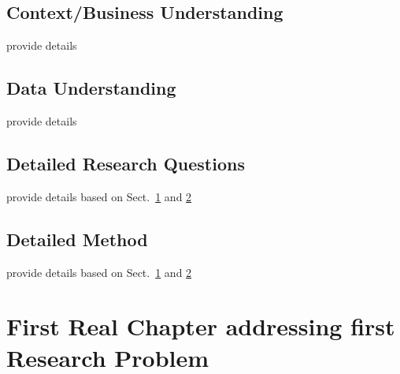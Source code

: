 \documentclass[12pt,a4paper,footinclude=true,twoside,headinclude=true]{report}
\begin{document}
\section{Context/Business Understanding}\label{sec:problem-exposition:context-understanding}

provide details

\section{Data Understanding}\label{sec:problem-exposition:data-understanding}

provide details

\section{Detailed Research Questions}\label{sec:problem-exposition:research-problems}

provide details based on Sect.~\ref{sec:problem-exposition:context-understanding} and  \ref{sec:problem-exposition:data-understanding} 

\section{Detailed Method}\label{sec:problem-exposition:research-method}

provide details based on Sect.~\ref{sec:problem-exposition:context-understanding} and  \ref{sec:problem-exposition:data-understanding} 



\chapter{First Real Chapter addressing first Research Problem}\label{sec:problem1}
\end{document}
